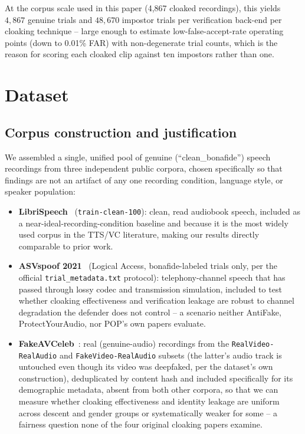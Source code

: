 \documentclass[11pt]{article}
\begin{document}
At the corpus scale used in this paper (4,867 cloaked recordings),
this yields $4{,}867$ genuine trials and $48{,}670$ impostor trials per
verification back-end per cloaking technique -- large enough to
estimate low-false-accept-rate operating points (down to 0.01\% FAR)
with non-degenerate trial counts, which is the reason for scoring each
cloaked clip against ten impostors rather than one.

\section{Dataset}
\label{sec:dataset}

\subsection{Corpus construction and justification}
We assembled a single, unified pool of genuine (``clean\_bonafide'')
speech recordings from three independent public corpora, chosen
specifically so that findings are not an artifact of any one
recording condition, language style, or speaker population:

\begin{itemize}
  \item \textbf{LibriSpeech}~\cite{panayotov2015librispeech}
    (\texttt{train-clean-100}): clean, read audiobook speech,
    included as a near-ideal-recording-condition baseline and because
    it is the most widely used corpus in the TTS/VC literature, making
    our results directly comparable to prior work.
  \item \textbf{ASVspoof 2021}~\cite{yamagishi2021asvspoof} (Logical
    Access, bonafide-labeled trials only, per the official
    \texttt{trial\_metadata.txt} protocol): telephony-channel speech
    that has passed through lossy codec and transmission simulation,
    included to test whether cloaking effectiveness and verification
    leakage are robust to channel degradation the defender does not
    control -- a scenario neither AntiFake, ProtectYourAudio, nor POP's
    own papers evaluate.
  \item \textbf{FakeAVCeleb}~\cite{khalid2021fakeavceleb}: real
    (genuine-audio) recordings from the \texttt{RealVideo-RealAudio}
    and \texttt{FakeVideo-RealAudio} subsets (the latter's audio track
    is untouched even though its video was deepfaked, per the
    dataset's own construction), deduplicated by content hash and
    included specifically for its demographic metadata, absent from
    both other corpora, so that we can measure whether cloaking
    effectiveness and identity leakage are uniform across descent and
    gender groups or systematically weaker for some -- a fairness
    question none of the four original cloaking papers examine.
\end{itemize}
\end{document}
